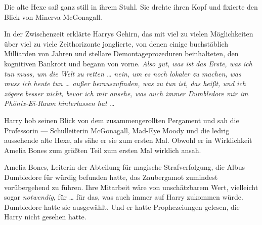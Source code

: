 Die alte Hexe saß ganz still in ihrem Stuhl. Sie drehte ihren Kopf und fixierte den Blick von Minerva McGonagall.

In der Zwischenzeit erklärte Harrys Gehirn, das mit viel zu vielen Möglichkeiten über viel zu viele Zeithorizonte jonglierte, von denen einige buchstäblich Milliarden von Jahren und stellare Demontageprozeduren beinhalteten, den kognitiven Bankrott und begann von vorne.
\emph{Also gut, was ist das \emph{Erste}, was ich tun muss, um die Welt zu retten … nein, um es noch lokaler zu machen, was muss ich heute tun … außer herauszufinden, was zu tun ist, das heißt, und ich zögere besser nicht, bevor ich mir ansehe, was auch immer Dumbledore mir im Phönix-Ei-Raum hinterlassen hat …}

Harry hob seinen Blick von dem zusammengerollten Pergament und sah die Professorin — Schulleiterin McGonagall, Mad-Eye Moody und die ledrig aussehende alte Hexe, als sähe er sie zum ersten Mal. Obwohl er in Wirklichkeit Amelia Bones zum größten Teil zum ersten Mal wirklich ansah.

Amelia Bones, Leiterin der Abteilung für magische Strafverfolgung, die Albus Dumbledore für würdig befunden hatte, das Zaubergamot zumindest vorübergehend zu führen. Ihre Mitarbeit wäre von unschätzbarem Wert, vielleicht sogar \emph{notwendig}, für … für das, was auch immer auf Harry zukommen würde. Dumbledore hatte sie ausgewählt. Und er hatte Prophezeiungen gelesen, die Harry nicht gesehen hatte.


